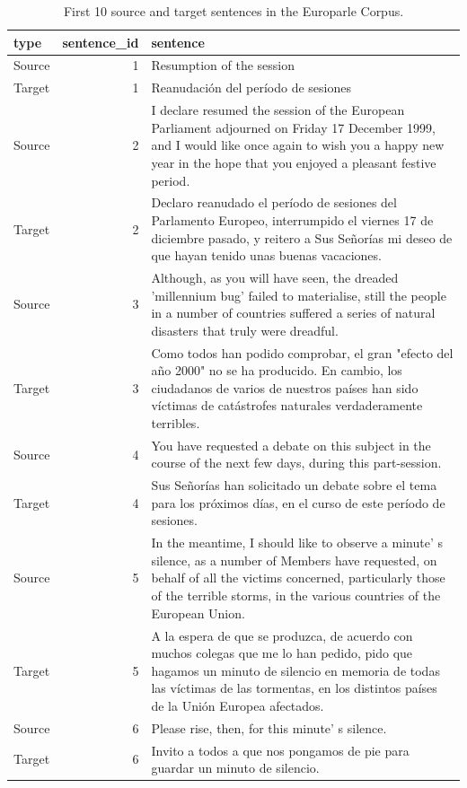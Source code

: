 \documentclass[
]{article}
\begin{document}
\begin{table}

\caption{\label{tab:structure-europarle}First 10 source and target sentences in the Europarle Corpus.}
\centering
\begin{tabular}[t]{lrl}
\toprule
type & sentence\_id & sentence\\
\midrule
Source & 1 & Resumption of the session\\
Target & 1 & Reanudación del período de sesiones\\
Source & 2 & I declare resumed the session of the European Parliament adjourned on Friday 17 December 1999, and I would like once again to wish you a happy new year in the hope that you enjoyed a pleasant festive period.\\
Target & 2 & Declaro reanudado el período de sesiones del Parlamento Europeo, interrumpido el viernes 17 de diciembre pasado, y reitero a Sus Señorías mi deseo de que hayan tenido unas buenas vacaciones.\\
Source & 3 & Although, as you will have seen, the dreaded 'millennium bug' failed to materialise, still the people in a number of countries suffered a series of natural disasters that truly were dreadful.\\
\addlinespace
Target & 3 & Como todos han podido comprobar, el gran "efecto del año 2000" no se ha producido. En cambio, los ciudadanos de varios de nuestros países han sido víctimas de catástrofes naturales verdaderamente terribles.\\
Source & 4 & You have requested a debate on this subject in the course of the next few days, during this part-session.\\
Target & 4 & Sus Señorías han solicitado un debate sobre el tema para los próximos días, en el curso de este período de sesiones.\\
Source & 5 & In the meantime, I should like to observe a minute' s silence, as a number of Members have requested, on behalf of all the victims concerned, particularly those of the terrible storms, in the various countries of the European Union.\\
Target & 5 & A la espera de que se produzca, de acuerdo con muchos colegas que me lo han pedido, pido que hagamos un minuto de silencio en memoria de todas las víctimas de las tormentas, en los distintos países de la Unión Europea afectados.\\
\addlinespace
Source & 6 & Please rise, then, for this minute' s silence.\\
Target & 6 & Invito a todos a que nos pongamos de pie para guardar un minuto de silencio.\\

\end{tabular}
\end{table}
\end{document}
